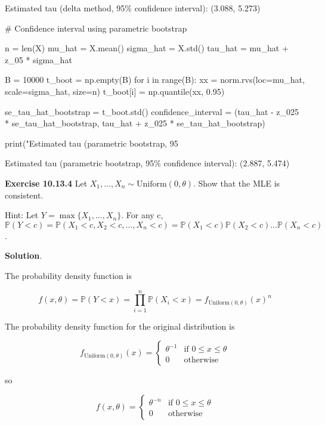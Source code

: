 \begin{console}
Estimated tau (delta method, 95\% confidence interval):   (3.088, 5.273)
\end{console}

\begin{python}
# Confidence interval using parametric bootstrap

n = len(X)
mu_hat = X.mean()
sigma_hat = X.std()
tau_hat = mu_hat + z_05 * sigma_hat

B = 10000
t_boot = np.empty(B)
for i in range(B):
    xx = norm.rvs(loc=mu_hat, scale=sigma_hat, size=n)
    t_boot[i] = np.quantile(xx, 0.95)
    
se_tau_hat_bootstrap = t_boot.std()
confidence_interval = (tau_hat - z_025 * se_tau_hat_bootstrap, tau_hat + z_025 * se_tau_hat_bootstrap)

print("Estimated tau (parametric bootstrap, 95%
\end{python}

\begin{console}
Estimated tau (parametric bootstrap, 95\% confidence interval):   (2.887, 5.474)
\end{console}

\textbf{Exercise 10.13.4} Let
\(X_1, \dots, X_n \sim \text{Uniform}(0, \theta)\). Show that the MLE is
consistent.

Hint: Let \(Y = \max \{ X_1, \dots, X_n \}\). For any c,
\(\mathbb{P}(Y < c) = \mathbb{P}(X_1 < c, X_2 < c, \dots, X_n < c) = \mathbb{P}(X_1 < c)\mathbb{P}(X_2 < c)\dots\mathbb{P}(X_n < c)\).

\textbf{Solution}.

The probability density function is

\[ f(x, \theta) = \mathbb{P}(Y < x) = \prod_{i = 1}^n \mathbb{P}(X_i < x) = f_{\text{Uniform}(0, \theta)}(x)^n \]

The probability density function for the original distribution is

\[ f_{\text{Uniform}(0, \theta)}(x) = \begin{cases}
\theta^{-1} & \text{if } 0 \leq x \leq \theta \\
0 & \text{otherwise}
\end{cases}
\]

so

\[ f(x, \theta) = \begin{cases}
\theta^{-n} & \text{if } 0 \leq x \leq \theta \\
0 & \text{otherwise}
\end{cases}
\]

